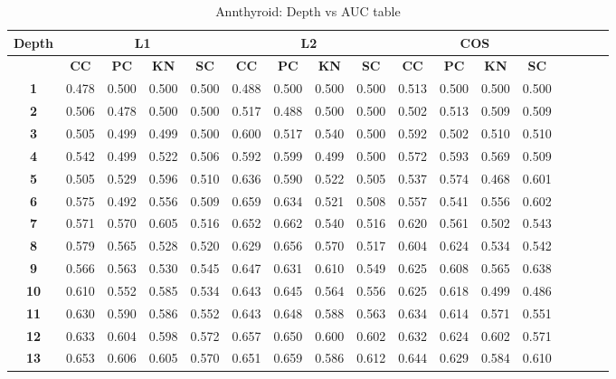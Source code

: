 \begin{table*}[!t]
\caption{Annthyroid: Depth vs AUC table}
\label{comparisons:annthyroid}
\centering
\begin{tabular}{|c|c|c|c|c|c|c|c|c|c|c|c|c|c|c|c|c|}
\hline
\bfseries Depth & \multicolumn{4}{c|}{\textbf{L1}} & \multicolumn{4}{c|}{\textbf{L2}} & \multicolumn{4}{c|}{\textbf{COS}} \\
\hline
\bfseries  & \bfseries CC & \bfseries PC & \bfseries KN & \bfseries SC & \bfseries CC & \bfseries PC & \bfseries KN & \bfseries SC & \bfseries CC & \bfseries PC & \bfseries KN & \bfseries SC \\
\hline
\bfseries 1 & 0.478 & 0.500 & 0.500 & 0.500 & 0.488 & 0.500 & 0.500 & 0.500 & 0.513 & 0.500 & 0.500 & 0.500 \\
\hline
\bfseries 2 & 0.506 & 0.478 & 0.500 & 0.500 & 0.517 & 0.488 & 0.500 & 0.500 & 0.502 & 0.513 & 0.509 & 0.509 \\
\hline
\bfseries 3 & 0.505 & 0.499 & 0.499 & 0.500 & 0.600 & 0.517 & 0.540 & 0.500 & 0.592 & 0.502 & 0.510 & 0.510 \\
\hline
\bfseries 4 & 0.542 & 0.499 & 0.522 & 0.506 & 0.592 & 0.599 & 0.499 & 0.500 & 0.572 & 0.593 & 0.569 & 0.509 \\
\hline
\bfseries 5 & 0.505 & 0.529 & 0.596 & 0.510 & 0.636 & 0.590 & 0.522 & 0.505 & 0.537 & 0.574 & 0.468 & 0.601 \\
\hline
\bfseries 6 & 0.575 & 0.492 & 0.556 & 0.509 & 0.659 & 0.634 & 0.521 & 0.508 & 0.557 & 0.541 & 0.556 & 0.602 \\
\hline
\bfseries 7 & 0.571 & 0.570 & 0.605 & 0.516 & 0.652 & 0.662 & 0.540 & 0.516 & 0.620 & 0.561 & 0.502 & 0.543 \\
\hline
\bfseries 8 & 0.579 & 0.565 & 0.528 & 0.520 & 0.629 & 0.656 & 0.570 & 0.517 & 0.604 & 0.624 & 0.534 & 0.542 \\
\hline
\bfseries 9 & 0.566 & 0.563 & 0.530 & 0.545 & 0.647 & 0.631 & 0.610 & 0.549 & 0.625 & 0.608 & 0.565 & 0.638 \\
\hline
\bfseries 10 & 0.610 & 0.552 & 0.585 & 0.534 & 0.643 & 0.645 & 0.564 & 0.556 & 0.625 & 0.618 & 0.499 & 0.486 \\
\hline
\bfseries 11 & 0.630 & 0.590 & 0.586 & 0.552 & 0.643 & 0.648 & 0.588 & 0.563 & 0.634 & 0.614 & 0.571 & 0.551 \\
\hline
\bfseries 12 & 0.633 & 0.604 & 0.598 & 0.572 & 0.657 & 0.650 & 0.600 & 0.602 & 0.632 & 0.624 & 0.602 & 0.571 \\
\hline
\bfseries 13 & 0.653 & 0.606 & 0.605 & 0.570 & 0.651 & 0.659 & 0.586 & 0.612 & 0.644 & 0.629 & 0.584 & 0.610 \\

\end{tabular}
\end{table*}
